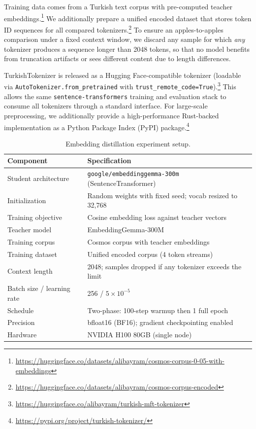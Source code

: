 Training data comes from a Turkish text corpus with pre-computed teacher embeddings.\footnote{\url{https://huggingface.co/datasets/alibayram/cosmos-corpus-0-05-with-embeddings}} We additionally prepare a unified encoded dataset that stores token ID sequences for all compared tokenizers.\footnote{\url{https://huggingface.co/datasets/alibayram/cosmos-corpus-encoded}} To ensure an apples-to-apples comparison under a fixed context window, we discard any sample for which \emph{any} tokenizer produces a sequence longer than 2048 tokens, so that no model benefits from truncation artifacts or sees different content due to length differences.

TurkishTokenizer is released as a Hugging Face-compatible tokenizer (loadable via \texttt{AutoTokenizer.from\_pretrained} with \texttt{trust\_remote\_code=True}).\footnote{\url{https://huggingface.co/alibayram/turkish-mft-tokenizer}} This allows the same \texttt{sentence-transformers} training and evaluation stack to consume all tokenizers through a standard interface. For large-scale preprocessing, we additionally provide a high-performance Rust-backed implementation as a Python Package Index (PyPI) package.\footnote{\url{https://pypi.org/project/turkish-tokenizer/}}

\begin{table}[H]
\centering
\caption{Embedding distillation experiment setup.}
\label{tab:distillation_setup}
\begin{tabular}{ll}
\toprule
\textbf{Component} & \textbf{Specification} \\
\midrule
Student architecture & \texttt{google/embeddinggemma-300m} (SentenceTransformer) \\
Initialization & Random weights with fixed seed; vocab resized to 32,768 \\
Training objective & Cosine embedding loss against teacher vectors \\
Teacher model & EmbeddingGemma-300M \\
Training corpus & Cosmos corpus with teacher embeddings \\
Training dataset & Unified encoded corpus (4 token streams) \\
Context length & 2048; samples dropped if any tokenizer exceeds the limit \\
Batch size / learning rate & 256 / $5 \times 10^{-5}$ \\
Schedule & Two-phase: 100-step warmup then 1 full epoch \\
Precision & bfloat16 (BF16); gradient checkpointing enabled \\
Hardware & NVIDIA H100 80GB (single node) \\
\bottomrule
\end{tabular}
\end{table}

